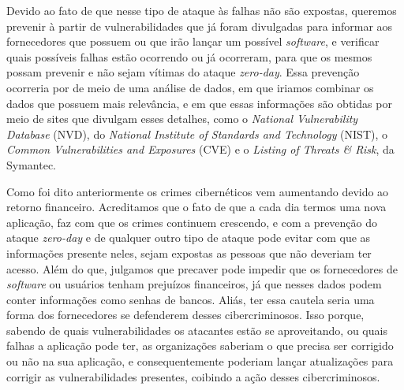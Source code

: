 Devido ao fato de que nesse tipo de ataque às falhas não são expostas, queremos prevenir à partir de vulnerabilidades que já foram 
divulgadas para informar aos fornecedores que possuem ou que irão lançar um possível \textit{software}, e verificar quais possíveis 
falhas estão ocorrendo ou já ocorreram, para que os mesmos possam prevenir e não sejam vítimas do ataque \textit{zero-day}. Essa 
prevenção ocorreria por de meio de uma análise de dados, em que iriamos combinar os dados que possuem mais relevância, e em que essas 
informações são obtidas por meio de sites que divulgam esses detalhes, como o \textit{National Vulnerability Database} (NVD), do 
\textit{National Institute of Standards and Technology} (NIST), o \textit{Common Vulnerabilities and Exposures} (CVE) e o 
\textit{Listing of Threats \& Risk}, da Symantec.

Como foi dito anteriormente os crimes cibernéticos vem aumentando devido ao retorno financeiro. Acreditamos que o fato de que a cada dia 
termos uma nova aplicação, faz com que os crimes continuem crescendo, e com a prevenção do ataque \textit{zero-day} e de qualquer outro 
tipo de ataque pode evitar com que as informações presente neles, sejam expostas as pessoas que não deveriam ter acesso. Além do que, 
julgamos que precaver pode impedir que os fornecedores de \textit{software} ou usuários tenham prejuízos financeiros, já que nesses dados 
podem conter informações como senhas de bancos. Aliás, ter essa cautela seria uma forma dos fornecedores se defenderem desses 
cibercriminosos. Isso porque, sabendo de quais vulnerabilidades os atacantes estão se aproveitando, ou quais falhas a aplicação pode 
ter, as organizações saberiam o que precisa ser corrigido ou não na sua aplicação, e consequentemente poderiam lançar atualizações para corrigir as vulnerabilidades presentes, coibindo a ação desses cibercriminosos. 
